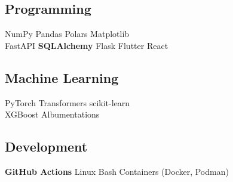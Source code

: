 \documentclass[]{resume-template}
\begin{document}
\begin{minipage}[t]{0.33\textwidth}
    \subsection{Programming}\label{subsec:programming}
    NumPy\textbullet{} Pandas\textbullet{} Polars\textbullet{} Matplotlib\\
    FastAPI \textbullet{} \textbf{SQLAlchemy} \textbullet{} Flask
    \newline{}
    Flutter \textbullet{} React


    \vspace*{1pt}\subsection{Machine Learning}\label{subsec:mltools}
    PyTorch \textbullet{} Transformers \textbullet{} scikit-learn \\
    XGBoost \textbullet{} Albumentations

    \vspace*{1pt}\subsection{Development}
    \textbf{GitHub Actions} \textbullet{}  Linux \textbullet{} Bash \textbullet{} Containers (Docker, Podman)



\end{minipage}
\end{document}
